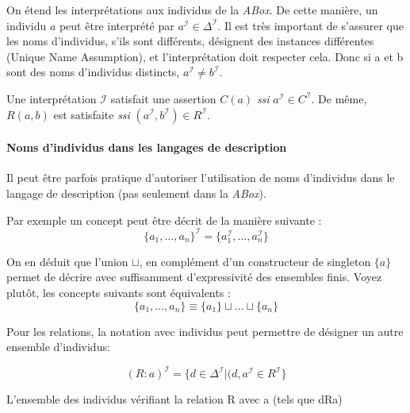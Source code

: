 \par On étend les interprétations aux individus de la \emph{ABox}. De cette manière, un individu $a$ peut être interprété par $a^\mathcal{I} \in \Delta^\mathcal{I}$. Il est très important de s'assurer que les noms d'individus, s'ils sont différents, désignent des instances différentes (Unique Name Assumption), et l'interprétation doit respecter cela. Donc si a et b sont des noms d'individus distincts, $a^\mathcal{I}\neq b^\mathcal{I}$.
\par Une interprétation $\mathcal{I}$ satisfait une assertion $C(a)$ \emph{ssi} $a^\mathcal{I} \in C^\mathcal{I}$. De même, $R(a,b)$ est satisfaite \emph{ssi} $(a^\mathcal{I},b^\mathcal{I}) \in R^\mathcal{I}$.

\paragraph{Noms d'individus dans les langages de description}
\label{sec:noms-dindividus-dans}

\par Il peut être parfois pratique d'autoriser l'utilisation de noms d'individus dans le langage de description (pas seulement dans la \emph{ABox}).

\par Par exemple un concept peut être décrit de la manière suivante :
\begin{displaymath}
  \{a_1,\dots,a_n\}^\mathcal{I} = \{a_1^\mathcal{I},\dots, a_n^\mathcal{I}\}
\end{displaymath}

\par On en déduit que l'union $\sqcup$, en complément d'un constructeur de singleton $\{a\}$ permet de décrire avec suffisamment d'expressivité des ensembles finis. Voyez plutôt, les concepts suivants sont équivalents :
\begin{displaymath}
  \{a_1,\dots, a_n\} \equiv \{a_1\}\sqcup\dots \sqcup\{a_n\}
\end{displaymath}

\par Pour les relations, la notation avec individus peut permettre de désigner un autre ensemble d'individus:

\begin{displaymath}
  (R:a)^\mathcal{I} = \{d\in \Delta^\mathcal{I}|(d,a^\mathcal{I} \in R^\mathcal{I}\}
\end{displaymath}

\par L'ensemble des individus vérifiant la relation R avec a (tels que dRa)

